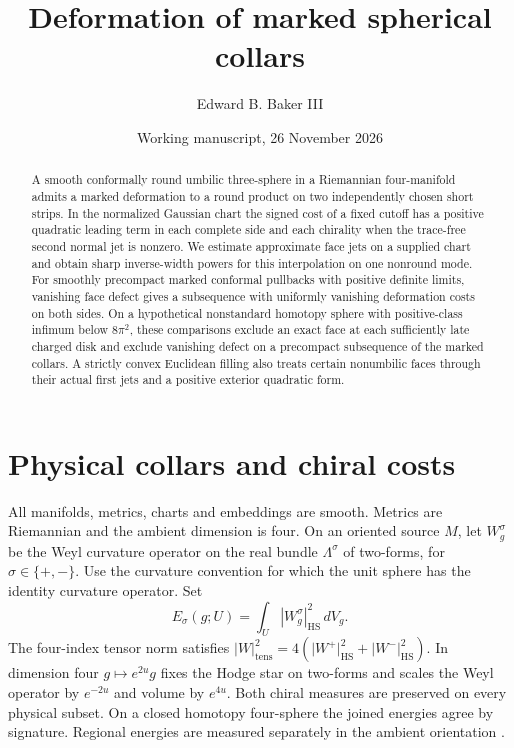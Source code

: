 \documentclass[11pt,letterpaper]{article}
\title{Deformation of marked spherical collars}
\author{Edward B. Baker III}
\date{Working manuscript, 26 November 2026}
\numberwithin{equation}{section}
\newcommand{\HS}{\mathrm{HS}}
\begin{document}
\maketitle
\begin{abstract}
A smooth conformally round umbilic three-sphere in a Riemannian
four-manifold admits a marked deformation to a round product on two
independently chosen short strips. In the normalized Gaussian chart
the signed cost of a fixed cutoff has a positive quadratic leading
term in each complete side and each chirality when the trace-free
second normal jet is nonzero. We estimate approximate face jets on
a supplied chart and obtain sharp inverse-width powers for this
interpolation on one nonround mode. For smoothly precompact marked
conformal pullbacks with positive definite limits, vanishing face
defect gives a subsequence with uniformly vanishing deformation
costs on both sides. On a hypothetical nonstandard homotopy sphere
with positive-class infimum below \(8\pi^2\), these comparisons
exclude an exact face at each sufficiently late charged disk and
exclude vanishing defect on a precompact subsequence of the marked
collars. A strictly convex Euclidean filling also treats certain nonumbilic
faces through their actual first jets and a positive exterior quadratic form.
\end{abstract}

\section{Physical collars and chiral costs}

All manifolds, metrics, charts and embeddings are smooth. Metrics
are Riemannian and the ambient dimension is four. On an oriented
source \(M\), let \(W^\sigma_g\) be the Weyl curvature operator on
the real bundle \(\Lambda^\sigma\) of two-forms, for
\(\sigma\in\{+,-\}\). Use the curvature convention for which the unit
sphere has the identity curvature operator. Set
\[
 E_\sigma(g;U)=\int_U |W^\sigma_g|_{\HS}^2\,dV_g .
\]
The four-index tensor norm satisfies
\(\lvert W\rvert_{\mathrm{tens}}^2
 =4(\lvert W^+\rvert_{\HS}^2+\lvert W^-\rvert_{\HS}^2)\).
In dimension four \(g\mapsto e^{2u}g\) fixes the Hodge star on
two-forms and scales the Weyl operator by \(e^{-2u}\) and volume
by \(e^{4u}\). Both chiral measures are preserved on every physical
subset. On a closed homotopy four-sphere the joined energies agree
by signature. Regional energies are measured separately in the
ambient orientation \cite{Hirzebruch1971Signature,Baker2026ChiralMaster}.
\end{document}
